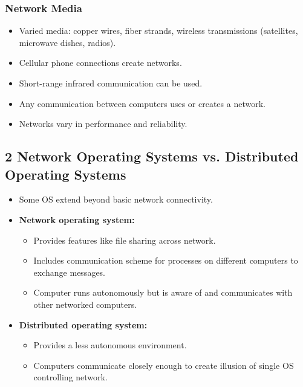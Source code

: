 \documentclass{article}
\begin{document}
\subsubsection*{Network Media}
\begin{itemize}
    \item Varied media: copper wires, fiber strands, wireless transmissions (satellites, microwave dishes, radios).
    \item Cellular phone connections create networks.
    \item Short-range infrared communication can be used.
    \item Any communication between computers uses or creates a network.
    \item Networks vary in performance and reliability.
\end{itemize}

\subsection*{2 Network Operating Systems vs. Distributed Operating Systems}
\begin{itemize}
    \item Some OS extend beyond basic network connectivity.
    \item \textbf{Network operating system:}
    \begin{itemize}
        \item Provides features like file sharing across network.
        \item Includes communication scheme for processes on different computers to exchange messages.
        \item Computer runs autonomously but is aware of and communicates with other networked computers.
    \end{itemize}
    \item \textbf{Distributed operating system:}
    \begin{itemize}
        \item Provides a less autonomous environment.
        \item Computers communicate closely enough to create illusion of single OS controlling network.
    \end{itemize}
\end{itemize}
\end{document}
